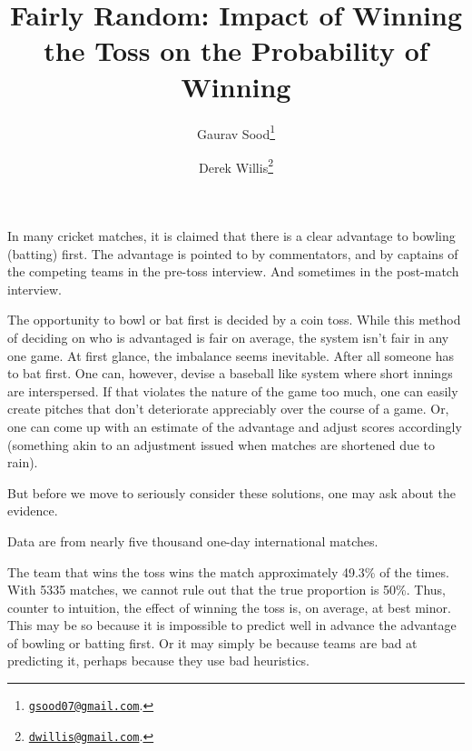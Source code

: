 \documentclass[11pt]{article}
\begin{document}
\title{\vspace{-2.0cm}\normalsize{\textbf{Fairly Random: Impact of Winning the Toss on the Probability of Winning}}}
\author{Gaurav Sood\thanks{\href{mailto:gsood07@gmail.com}{\texttt{gsood07@gmail.com}}.} \and Derek Willis\thanks{\href{mailto:dwillis@gmail.com}{\texttt{dwillis@gmail.com}}.}}
\maketitle
\doublespacing

In many cricket matches, it is claimed that there is a clear advantage to bowling (batting) first. The advantage is pointed to by commentators, and by captains of the competing teams in the pre-toss interview. And sometimes in the post-match interview.

The opportunity to bowl or bat first is decided by a coin toss. While this method of deciding on who is advantaged is fair on average, the system isn't fair in any one game. At first glance, the imbalance seems inevitable. After all someone has to bat first. One can, however, devise a baseball like system where short innings are interspersed. If that violates the nature of the game too much, one can easily create pitches that don't deteriorate appreciably over the course of a game. Or, one can come up with an estimate of the advantage and adjust scores accordingly (something akin to an adjustment issued when matches are shortened due to rain).

But before we move to seriously consider these solutions, one may ask about the evidence.

Data are from nearly five thousand one-day international matches.

The team that wins the toss wins the match approximately 49.3\% of the times. With 5335 matches, we cannot rule out that the true proportion is 50\%. Thus, counter to intuition, the effect of winning the toss is, on average, at best minor. This may be so because it is impossible to predict well in advance the advantage of bowling or batting first. Or it may simply be because teams are bad at predicting it, perhaps because they use bad heuristics.
\end{document}
